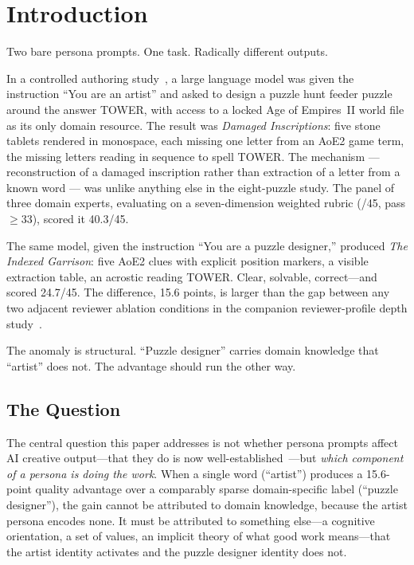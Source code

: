 \section{Introduction}

Two bare persona prompts. One task. Radically different outputs.

In a controlled authoring study~\cite{dellaLibera2025taxonomy}, a large language model was given the instruction ``You are an artist'' and asked to design a puzzle hunt feeder puzzle around the answer TOWER, with access to a locked Age of Empires~II world file as its only domain resource. The result was \emph{Damaged Inscriptions}: five stone tablets rendered in monospace, each missing one letter from an AoE2 game term, the missing letters reading in sequence to spell TOWER. The mechanism --- reconstruction of a damaged inscription rather than extraction of a letter from a known word --- was unlike anything else in the eight-puzzle study. The panel of three domain experts, evaluating on a seven-dimension weighted rubric (/45, pass $\geq 33$), scored it 40.3/45.

The same model, given the instruction ``You are a puzzle designer,'' produced \emph{The Indexed Garrison}: five AoE2 clues with explicit position markers, a visible extraction table, an acrostic reading TOWER. Clear, solvable, correct---and scored 24.7/45. The difference, 15.6 points, is larger than the gap between any two adjacent reviewer ablation conditions in the companion reviewer-profile depth study~\cite{dellaLibera2025panel}.

The anomaly is structural. ``Puzzle designer'' carries domain knowledge that ``artist'' does not. The advantage should run the other way.

\subsection{The Question}

The central question this paper addresses is not whether persona prompts affect AI creative output---that they do is now well-established~\cite{park2023generative,zhang2018personas}---but \emph{which component of a persona is doing the work}. When a single word (``artist'') produces a 15.6-point quality advantage over a comparably sparse domain-specific label (``puzzle designer''), the gain cannot be attributed to domain knowledge, because the artist persona encodes none. It must be attributed to something else---a cognitive orientation, a set of values, an implicit theory of what good work means---that the artist identity activates and the puzzle designer identity does not.

